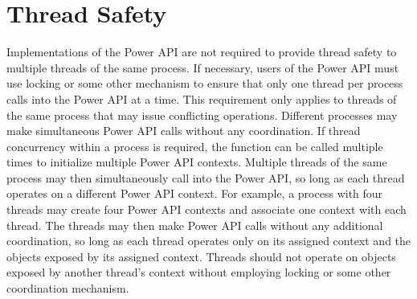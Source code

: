 \section{Thread Safety}\label{sec:ThreadSafety}
Implementations of the Power API are not required to provide thread safety to multiple threads of the same process.  
If necessary, users of the Power API must use locking or some other mechanism to ensure that only one thread per process calls into the Power API at a time.  
This requirement only applies to threads of the same process that may issue conflicting operations.  
Different processes may make simultaneous Power API calls without any coordination.  
If thread concurrency within a process is required, the  function can be called multiple times to initialize multiple Power API contexts.  
Multiple threads of the same process may then simultaneously call into the Power API, so long as each thread operates on a different Power API context.  
For example, a process with four threads may create four Power API contexts and associate one context with each thread.  
The threads may then make Power API calls without any additional coordination, so long as each thread operates only on its assigned context and the objects exposed by its assigned context. 
Threads should not operate on objects exposed by another thread's context without employing locking or some other coordination mechanism.

